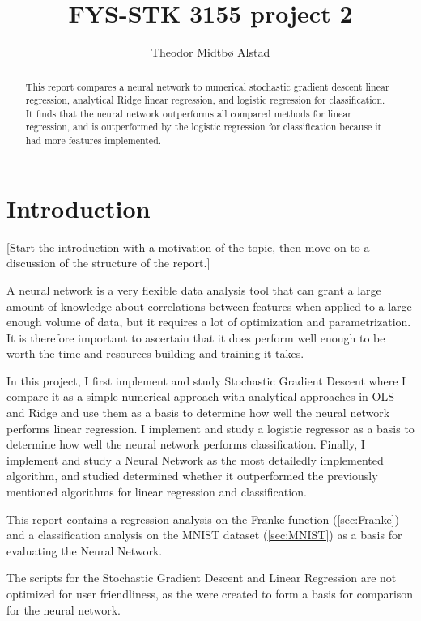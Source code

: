 \documentclass[a4paper, UKenglish]{article}
\newcommand{\0}{\mathbf{0}}
\newcommand{\1}{\mathbf{1}}
\begin{document}
\title{FYS-STK 3155 project 2}
\author{Theodor Midtbø Alstad}
\maketitle

\begin{abstract}
This report compares a neural network to numerical stochastic gradient descent linear regression, analytical Ridge linear regression, and logistic regression for classification. It finds that the neural network outperforms all compared methods for linear regression, and is outperformed by the logistic regression for classification because it had more features implemented.
\end{abstract}

\section{Introduction}
[Start the introduction with a motivation of the topic, then move on to a discussion of the structure of the report.]

A neural network is a very flexible data analysis tool that can grant a large amount of knowledge about correlations between features when applied to a large enough volume of data, but it requires a lot of optimization and parametrization. It is therefore important to ascertain that it does perform well enough to be worth the time and resources building and training it takes.

In this project, I first implement and study Stochastic Gradient Descent where I compare it as a simple numerical approach with analytical approaches in OLS and Ridge and use them as a basis to determine how well the neural network performs linear regression. I implement and study a logistic regressor as a basis to determine how well the neural network performs classification. Finally, I implement and study a Neural Network as the most detailedly implemented algorithm, and studied determined whether it outperformed the previously mentioned algorithms for linear regression and classification.

This report contains a regression analysis on the Franke function (\autoref{sec:Franke}) and a classification analysis on the MNIST dataset (\autoref{sec:MNIST}) as a basis for evaluating the Neural Network.


The scripts for the Stochastic Gradient Descent and Linear Regression are not optimized for user friendliness, as the were created to form a basis for comparison for the neural network.
\end{document}
